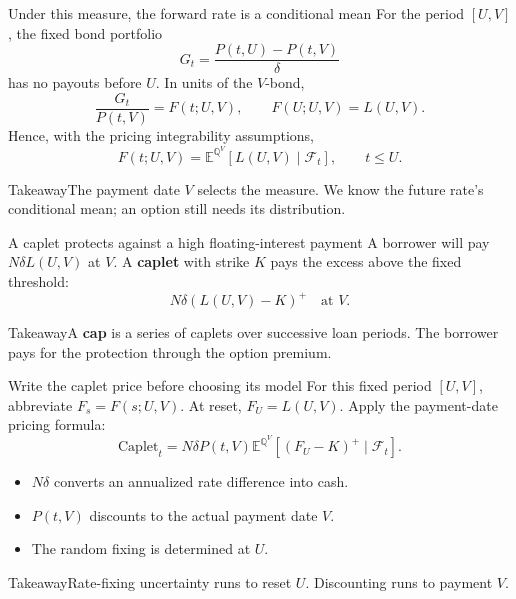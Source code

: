 \documentclass[handout,10pt,t,aspectratio=169]{beamer}
\newenvironment{keybox}{\begin{exampleblock}{Takeaway}}{\end{exampleblock}}
\newcommand{\E}{\mathbb E}
\newcommand{\Q}{\mathbb Q}
\newcommand{\F}{\mathcal F}
\begin{document}
\begin{frame}{Under this measure, the forward rate is a conditional mean}
For the period \([U,V]\), the fixed bond portfolio
\[
 G_t=\frac{P(t,U)-P(t,V)}{\delta}
\]
has no payouts before \(U\). In units of the \(V\)-bond,
\[
 \frac{G_t}{P(t,V)}=F(t;U,V),\qquad F(U;U,V)=L(U,V).
\]
Hence, with the pricing integrability assumptions,
\[
 \boxed{F(t;U,V)=\E^{\Q^V}[L(U,V)\mid\F_t],\qquad t\leq U.}
\]
\begin{keybox}The payment date \(V\) selects the measure.
We know the future rate's conditional mean; an option still needs its distribution.\end{keybox}
\end{frame}

\begin{frame}{A caplet protects against a high floating-interest payment}
A borrower will pay \(N\delta L(U,V)\) at \(V\).
A \textbf{caplet} with strike \(K\) pays the excess above the fixed threshold:
\[
 \boxed{N\delta(L(U,V)-K)^+\quad\text{at }V.}
\]
\begin{center}\end{center}
\begin{keybox}A \textbf{cap} is a series of caplets over successive loan periods.
The borrower pays for the protection through the option premium.\end{keybox}
\end{frame}

\begin{frame}{Write the caplet price before choosing its model}
For this fixed period \([U,V]\), abbreviate \(F_s=F(s;U,V)\).
At reset, \(F_U=L(U,V)\). Apply the payment-date pricing formula:
\[
 \boxed{\mathrm{Caplet}_t=N\delta P(t,V)
 \E^{\Q^V}[(F_U-K)^+\mid\F_t].}
\]
\begin{itemize}
\item \(N\delta\) converts an annualized rate difference into cash.
\item \(P(t,V)\) discounts to the actual payment date \(V\).
\item The random fixing is determined at \(U\).
\end{itemize}
\begin{keybox}Rate-fixing uncertainty runs to reset \(U\).
Discounting runs to payment \(V\).\end{keybox}
\end{frame}
\end{document}
